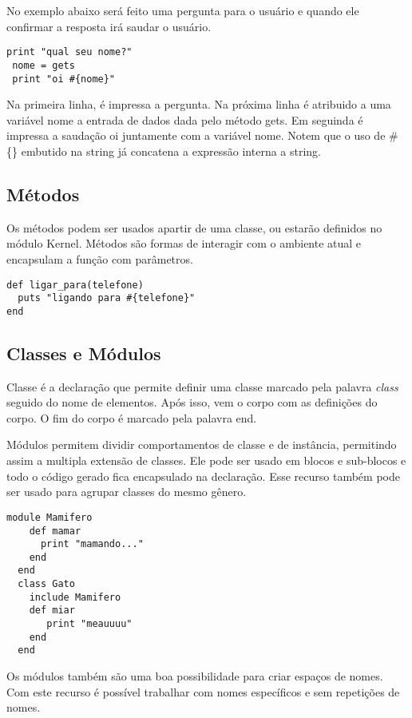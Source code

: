 \documentclass[espaco=simples,appendix=Name]{abnt}
\begin{document}
No exemplo abaixo será feito uma pergunta para o usuário e quando ele confirmar a resposta irá saudar o usuário.

\begin{lstlisting}[caption=Exemplo de entrada de dados ]
 print "qual seu nome?"
 nome = gets
 print "oi #{nome}"
\end{lstlisting}
 
Na primeira linha, é impressa a pergunta. Na próxima linha é atribuido a uma variável nome a entrada de dados dada pelo método gets.
Em seguinda é impressa a saudação oi juntamente com a variável nome. Notem que o uso de \#\{\} embutido na string já concatena a expressão interna a string.

\subsection { Métodos }

Os métodos podem ser usados apartir de uma classe, ou estarão definidos no módulo Kernel. Métodos são formas de interagir com o ambiente atual e encapsulam a função com parâmetros.

\begin{lstlisting}[caption=Exemplo de método ]
def ligar_para(telefone)
  puts "ligando para #{telefone}"
end
\end{lstlisting}

\subsection { Classes e Módulos }
 
Classe é a declaração que permite definir uma classe marcado pela palavra \textit{class} seguido do nome de elementos. Após isso, vem o corpo com as definições do corpo. O fim do corpo é marcado pela palavra end.

Módulos permitem dividir comportamentos de classe e de instância, permitindo assim a multipla extensão de classes. Ele pode ser usado em blocos e sub-blocos e todo o código gerado fica encapsulado na declaração. Esse recurso também pode ser usado para agrupar classes do mesmo gênero. 

\begin{lstlisting}[caption=Exemplo de módulo ]
  module Mamifero
    def mamar
      print "mamando..."
    end
  end
  class Gato
    include Mamifero
    def miar
       print "meauuuu"
    end
  end
\end{lstlisting}

Os módulos também são uma boa possibilidade para criar espaços de nomes. Com este recurso é possível trabalhar com nomes específicos e sem repetições de nomes.
\end{document}
